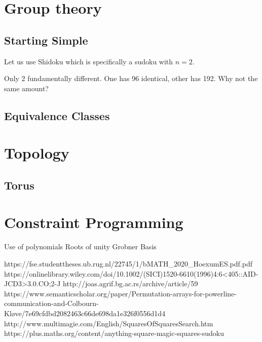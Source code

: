 \documentclass[a4paper,12pt]{article}
\begin{document}
\section{Group theory}
	\subsection{Starting Simple}
		Let us use Shidoku which is specifically a sudoku with $n=2$.

		Only 2 fundamentally different.
		One has 96 identical, other has 192. Why not the same amount?
		
	\subsection{Equivalence Classes}
\section{Topology}
	\subsection{Torus}
\section{Constraint Programming}
	Use of polynomials
	Roots of unity
	Grobner Basis

\begin{thebibliography}{100}
	 https://fse.studenttheses.ub.rug.nl/22745/1/bMATH_2020_HoexumES.pdf.pdf
	 https://onlinelibrary.wiley.com/doi/10.1002/(SICI)1520-6610(1996)4:6<405::AID-JCD3>3.0.CO;2-J
	 http://joas.agrif.bg.ac.rs/archive/article/59
	 https://www.semanticscholar.org/paper/Permutation-arrays-for-powerline-communication-and-Colbourn-Kløve/7e69cfdbd2082463c66de698da1e326f0556d1d4
	 http://www.multimagie.com/English/SquaresOfSquaresSearch.htm
	 https://plus.maths.org/content/anything-square-magic-squares-sudoku
\end{thebibliography}
\end{document}

